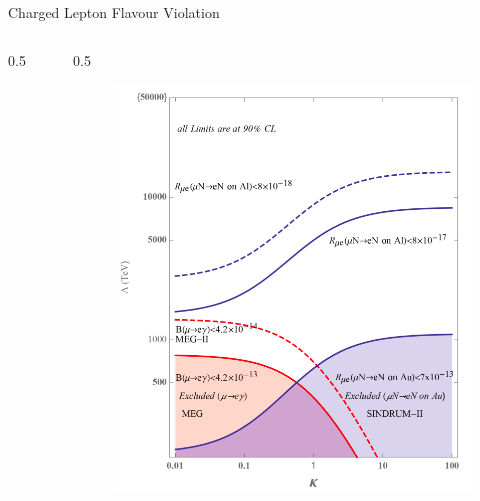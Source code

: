 \documentclass{beamer}
\begin{document}
\begin{frame}{Charged Lepton Flavour Violation}
\begin{columns}
\begin{column}{0.5\framewidth}
\begin{figure}[h]
            \end{figure}  
        \end{column}
        \begin{column}{0.5\framewidth}
            \begin{figure}[h]
                \centering
                \hspace*{-6ex}
                \includegraphics[width=0.85\columnwidth]{figures/png/Screenshot_20240313_120457.png}
            \end{figure}  
        \end{column}
    \end{columns}
    
    \end{frame}
\end{document}
